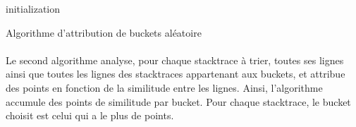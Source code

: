 \documentclass{article}
\begin{document}
\IncMargin{1em}
\begin{algorithm}[H]
\SetAlgoLined
\DontPrintSemicolon
{}
 initialization\;
\caption{Algorithme d'attribution de buckets aléatoire}
\end{algorithm}

\paragraph{}
Le second algorithme analyse, pour chaque stacktrace à trier, toutes ses lignes ainsi que toutes les lignes des stacktraces appartenant aux buckets, et attribue des points en fonction de la similitude entre les lignes. Ainsi, l'algorithme accumule des points de similitude par bucket. Pour chaque stacktrace, le bucket choisit est celui qui a le plus de points.
~~\\
\end{document}
